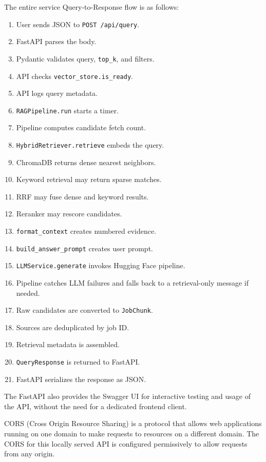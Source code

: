﻿\documentclass{article}
\begin{document}
The entire service Query-to-Response flow is as follows:
\begin{enumerate}
 \item User sends JSON to \texttt{POST /api/query}.
 \item FastAPI parses the body.
 \item Pydantic validates query, \texttt{top\_k}, and filters.
 \item API checks \texttt{vector\_store.is\_ready}.
 \item API logs query metadata.
 \item \texttt{RAGPipeline.run} starts a timer.
 \item Pipeline computes candidate fetch count.
 \item \texttt{HybridRetriever.retrieve} embeds the query.
 \item ChromaDB returns dense nearest neighbors.
 \item Keyword retrieval may return sparse matches.
 \item RRF may fuse dense and keyword results.
 \item Reranker may rescore candidates.
 \item \texttt{format\_context} creates numbered evidence.
 \item \texttt{build\_answer\_prompt} creates user prompt.
 \item \texttt{LLMService.generate} invokes Hugging Face pipeline.
 \item Pipeline catches LLM failures and falls back to a retrieval-only message if needed.
 \item Raw candidates are converted to \texttt{JobChunk}.
 \item Sources are deduplicated by job ID.
 \item Retrieval metadata is assembled.
 \item \texttt{QueryResponse} is returned to FastAPI.
 \item FastAPI serializes the response as JSON.
\end{enumerate}

The FastAPI also provides the Swagger UI for interactive testing and usage of the API, without the need for a dedicated 
frontend client. 

CORS (Cross Origin Resource Sharing) is a protocol that allows web applications running on one domain to make requests to resources on a different domain.
The CORS for this locally served API is configured permissively to allow requests from any origin.
\end{document}
